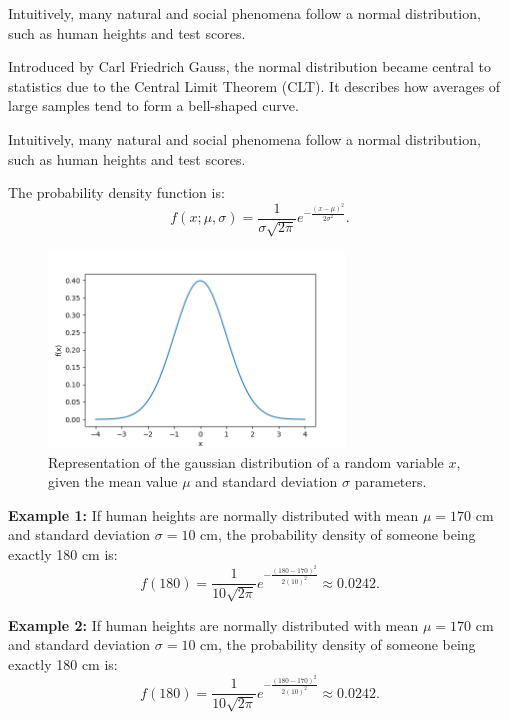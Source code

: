 \documentclass{book}
\begin{document}
Intuitively, many natural and social phenomena follow a normal distribution, such as human heights and test scores.

Introduced by Carl Friedrich Gauss, the normal distribution became central to statistics due to the Central Limit Theorem (CLT). It describes how averages of large samples tend to form a bell-shaped curve.

Intuitively, many natural and social phenomena follow a normal distribution, such as human heights and test scores.

The probability density function is:
\begin{equation}
    f(x; \mu, \sigma) = \frac{1}{\sigma \sqrt{2\pi}} e^{-\frac{(x-\mu)^2}{2\sigma^2}}.
\end{equation}

\begin{figure}[ht]
    \centering
    \includegraphics[width=0.7\textwidth]{figures/chapter2/normal.png}
    \caption{Representation of the gaussian distribution of a random variable $x$, given the mean value $\mu$ and standard deviation $\sigma$ parameters.}
    \label{fig:random}
\end{figure}

\textbf{Example 1:} If human heights are normally distributed with mean $\mu=170$ cm and standard deviation $\sigma=10$ cm, the probability density of someone being exactly 180 cm is:
\begin{equation}
    f(180) = \frac{1}{10 \sqrt{2\pi}} e^{-\frac{(180-170)^2}{2(10)^2}} \approx 0.0242.
\end{equation}

\textbf{Example 2:} If human heights are normally distributed with mean $\mu=170$ cm and standard deviation $\sigma=10$ cm, the probability density of someone being exactly 180 cm is:
\begin{equation}
    f(180) = \frac{1}{10 \sqrt{2\pi}} e^{-\frac{(180-170)^2}{2(10)^2}} \approx 0.0242.
\end{equation}
\end{document}

